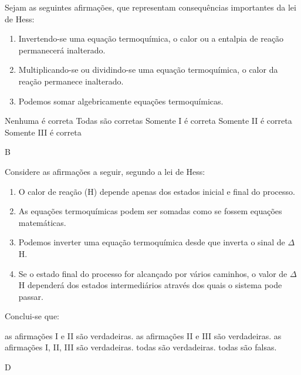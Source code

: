 \documentclass[9qpt]{scrartcl}
\begin{document}
\begin{exercise}[points=1.0]
Sejam as seguintes afirmações, que representam consequências importantes da lei de Hess:

\begin{enumerate}[label=\Roman*]
\item Invertendo-se uma equação termoquímica, o calor ou a entalpia de reação permanecerá inalterado.
\item Multiplicando-se ou dividindo-se uma equação termoquímica, o calor da reação permanece inalterado.
\item Podemos somar algebricamente equações termoquímicas.
\end{enumerate}
\begin{choice}
\choice Nenhuma é correta
\choice Todas são corretas
\choice Somente I é correta
\choice Somente II é correta
\choice Somente III é correta
\end{choice}
\end{exercise}
\begin{solution}
B
\end{solution}


\begin{exercise}[points=1.0]
Considere as afirmações a seguir, segundo a lei de Hess:

\begin{enumerate}[label=\Roman*]
\item O calor de reação (H) depende apenas dos estados inicial e final do processo.
\item As equações termoquímicas podem ser somadas como se fossem equações matemáticas.
\item Podemos inverter uma equação termoquímica desde que inverta o sinal de $\Delta$H.
\item Se o estado final do processo for alcançado por vários caminhos, o valor de $\Delta$H dependerá dos estados intermediários através dos quais o sistema pode passar.
\end{enumerate}


Conclui-se que:
\begin{choice}
\choice as afirmações I e II são verdadeiras.
\choice as afirmações II e III são verdadeiras.
\choice as afirmações I, II, III são verdadeiras.
\choice todas são verdadeiras.
\choice todas são falsas.
\end{choice}
\end{exercise}
\begin{solution}
D
\end{solution}
\end{document}
